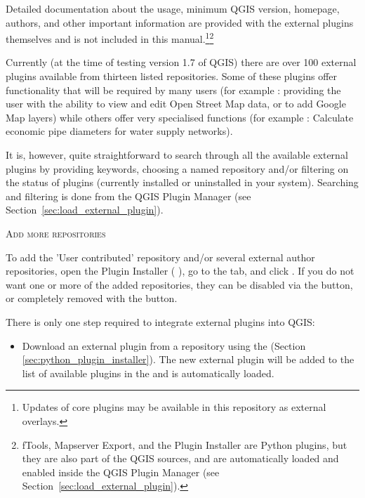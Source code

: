 Detailed documentation about the usage, minimum QGIS version, homepage, authors,
and other important information are provided with the external plugins themselves
and is not included in this manual.\footnote{Updates of core plugins may be
available in this repository as external overlays.}\footnote{fTools, Mapserver 
Export, and the Plugin Installer are Python plugins, but they are also part of 
the QGIS sources, and are automatically loaded and enabled inside the QGIS 
Plugin Manager (see Section~\ref{sec:load_external_plugin}).}

Currently (at the time of testing version 1.7 of QGIS) there are over 100 external 
plugins available from thirteen listed repositories. Some of these plugins offer
functionality that will be required by many users (for example : providing the user 
with the ability to view and edit Open Street Map data, or to add Google Map layers)
while others offer very specialised functions (for example : Calculate economic pipe diameters
for water supply networks).

It is, however, quite straightforward to search through all the available external plugins
by providing keywords, choosing a named repository and/or filtering on the status of plugins 
(currently installed or uninstalled in your system). Searching and filtering is done from the 
QGIS Plugin Manager (see Section~\ref{sec:load_external_plugin}).


\begin{Tip} \caption{\textsc{Add more repositories}}
To add the 'User contributed' repository and/or several external author repositories, open the
Plugin Installer ( \arrow {}),
go to the  tab, and click .
If you do not want one or more of the added repositories, they can be disabled via the
 button, or completely removed with the  button.
\end{Tip}

There is only one step required to integrate external plugins into QGIS:

\begin{itemize}[label=--]
\item Download an external plugin from a repository using the
 (Section \ref{sec:python_plugin_installer}).
The new external plugin will be added to the list of available plugins in
the  and is automatically loaded.
\end{itemize}

